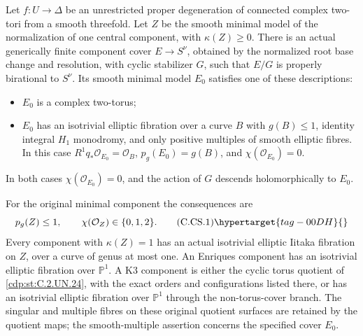 \begin{proposition}\hypertarget{tag-01DA}{}\label{cdp:st:C.2.UN.31}


Let $f:U\to\Delta$ be an unrestricted proper degeneration
of connected complex two-tori from a smooth threefold.
Let $Z$ be the smooth minimal model of the normalization
of one central component, with $\kappa(Z)\ge0$.
There is an actual generically finite component cover
$E\to S^\nu$, obtained by the normalized root base change
and resolution, with cyclic stabilizer $G$, such that
$E/G$ is properly birational to $S^\nu$. Its smooth
minimal model $E_0$ satisfies one of these descriptions:

\begin{itemize}
\item $E_0$ is a complex two-torus;
\item $E_0$ has an isotrivial elliptic fibration over a
curve $B$ with $g(B)\le1$, identity integral $H_1$
monodromy, and only positive multiples of smooth
elliptic fibres. In this case
$R^1q_*\mathcal O_{E_0}=\mathcal O_B$,
$p_g(E_0)=g(B)$, and $\chi(\mathcal O_{E_0})=0$.
\end{itemize}
In both cases $\chi(\mathcal O_{E_0})=0$, and the
action of $G$ descends holomorphically to $E_0$.

For the original minimal component the consequences are
\[
 p_g(Z)\le1,
 \qquad \chi(\mathcal O_Z)\in\{0,1,2\}.
                                                               \tag{C.CS.1}\hypertarget{tag-00DH}{}\label{cdp:eq:C.CS.1}
\]
Every component with $\kappa(Z)=1$ has an actual
isotrivial elliptic Iitaka fibration on $Z$, over a
curve of genus at most one. An Enriques component
has an isotrivial elliptic fibration over $\mathbb P^1$.
A K3 component is either the cyclic torus quotient
of \ref{cdp:st:C.2.UN.24}, with the exact orders and configurations
listed there, or has an isotrivial elliptic fibration
over $\mathbb P^1$ through the non-torus-cover branch.
The singular and multiple fibres on these original
quotient surfaces are retained by the quotient maps;
the smooth-multiple assertion concerns the specified
cover $E_0$.
\end{proposition}
